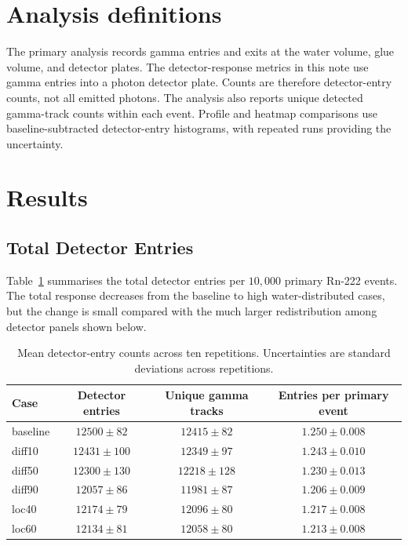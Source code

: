 \documentclass[11pt,a4paper]{article}
\begin{document}
\section{Analysis definitions}

The primary analysis records gamma entries and exits at the water volume,
glue volume, and detector plates.  The detector-response metrics in this
note use gamma entries into a photon detector plate.  Counts are therefore
detector-entry counts, not all emitted photons.  The analysis also reports
unique detected gamma-track counts within each event.  Profile and heatmap
comparisons use baseline-subtracted detector-entry histograms, with repeated
runs providing the uncertainty.

\section{Results}

\subsection{Total Detector Entries}

Table~\ref{tab:total-response} summarises the total detector entries per
\(10{,}000\) primary Rn-222 events.  The total response decreases from the
baseline to high water-distributed cases, but the change is small compared
with the much larger redistribution among detector panels shown below.

\begin{table}[h]
\centering
\caption{Mean detector-entry counts across ten repetitions.  Uncertainties
are standard deviations across repetitions.}
\label{tab:total-response}
\begin{tabular}{lccc}
\toprule
Case & Detector entries & Unique gamma tracks & Entries per primary event \\
\midrule
baseline & \(12500 \pm 82\) & \(12415 \pm 82\) & \(1.250 \pm 0.008\) \\
diff10 & \(12431 \pm 100\) & \(12349 \pm 97\) & \(1.243 \pm 0.010\) \\
diff50 & \(12300 \pm 130\) & \(12218 \pm 128\) & \(1.230 \pm 0.013\) \\
diff90 & \(12057 \pm 86\) & \(11981 \pm 87\) & \(1.206 \pm 0.009\) \\
loc40 & \(12174 \pm 79\) & \(12096 \pm 80\) & \(1.217 \pm 0.008\) \\
loc60 & \(12134 \pm 81\) & \(12058 \pm 80\) & \(1.213 \pm 0.008\) \\
\bottomrule
\end{tabular}
\end{table}
\end{document}
